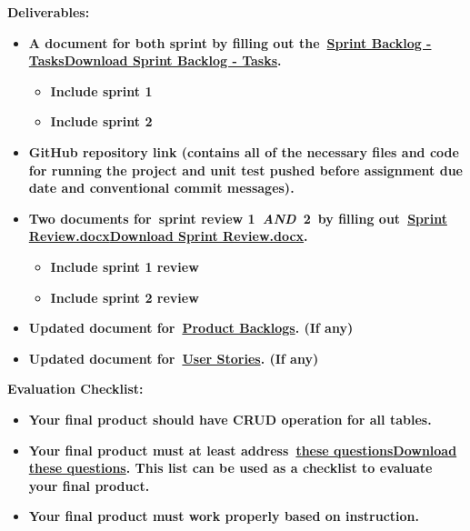\documentclass[
]{article}
\providecommand{\tightlist}{%
  \setlength{\itemsep}{0pt}\setlength{\parskip}{0pt}}
\begin{document}
\textbf{Deliverables:}

\begin{itemize}
\item
  \textbf{A document for both sprint by filling out
  the~\textbf{\href{https://instructure.charlotte.edu/courses/264138/files/33808466?wrap=1}{\textbf{Sprint
  Backlog -
  Tasks}}\href{https://instructure.charlotte.edu/courses/264138/files/33808466/download?download_frd=1}{\textbf{Download
  Sprint Backlog - Tasks}}}.}

  \begin{itemize}
  \tightlist
  \item
    \textbf{Include sprint 1}
  \item
    \textbf{Include sprint 2}
  \end{itemize}
\item
  \textbf{GitHub repository link (contains all of the necessary files
  and code for running the project and unit test pushed before
  assignment due date and conventional commit messages).}
\item
  \textbf{Two documents for~sprint review
  1~\emph{\textbf{\textbf{AND}}}~2~by filling
  out~\textbf{\href{https://instructure.charlotte.edu/courses/264138/files/33808472?wrap=1}{\textbf{Sprint
  Review.docx}}\href{https://instructure.charlotte.edu/courses/264138/files/33808472/download?download_frd=1}{\textbf{Download
  Sprint Review.docx}}}.}

  \begin{itemize}
  \tightlist
  \item
    \textbf{Include sprint 1 review}
  \item
    \textbf{Include sprint 2 review}
  \end{itemize}
\item
  \textbf{Updated document
  for~\textbf{\href{https://instructure.charlotte.edu/courses/264138/files/33808457?wrap=1}{\textbf{Product
  Backlogs}}}. (If any)}
\item
  \textbf{Updated document
  for~\textbf{\href{https://instructure.charlotte.edu/courses/264138/files/33808471?wrap=1}{\textbf{User
  Stories}}}. (If any)}
\end{itemize}

\textbf{Evaluation Checklist:}

\begin{itemize}
\tightlist
\item
  \textbf{Your final product should have CRUD operation for all tables.}
\item
  \textbf{Your final product must at least
  address~\textbf{\href{https://instructure.charlotte.edu/courses/264138/files/33808478?wrap=1}{\textbf{these
  questions}}\href{https://instructure.charlotte.edu/courses/264138/files/33808478/download?download_frd=1}{\textbf{Download
  these questions}}}. This list can be used as a checklist to evaluate
  your final product.}
\item
  \textbf{Your final product must work properly based on instruction.}
\end{itemize}
\end{document}
